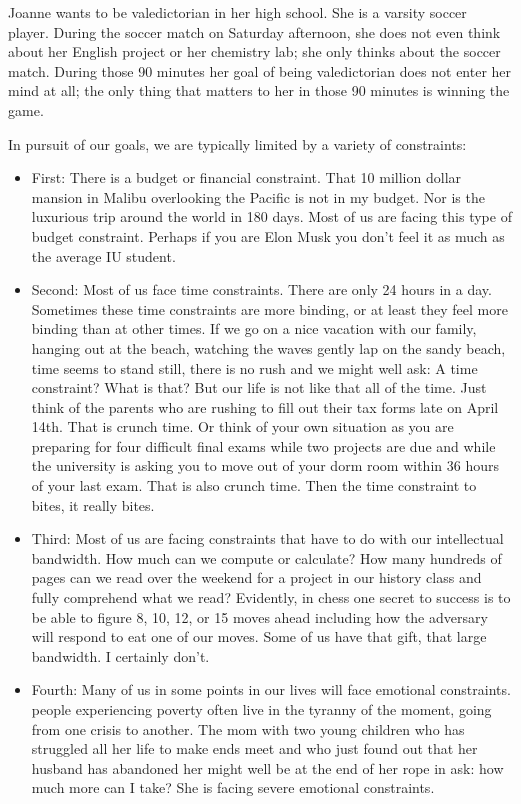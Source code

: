 \documentclass[
]{book}
\begin{document}
Joanne wants to be valedictorian in her high school. She is a varsity soccer player. During the soccer match on Saturday afternoon, she does not even think about her English project or her chemistry lab; she only thinks about the soccer match. During those 90 minutes her goal of being valedictorian does not enter her mind at all; the only thing that matters to her in those 90 minutes is winning the game.

In pursuit of our goals, we are typically limited by a variety of constraints:

\begin{itemize}
\item
  First: There is a budget or financial constraint. That 10 million dollar mansion in Malibu overlooking the Pacific is not in my budget. Nor is the luxurious trip around the world in 180 days. Most of us are facing this type of budget constraint. Perhaps if you are Elon Musk you don't feel it as much as the average IU student.
\item
  Second: Most of us face time constraints. There are only 24 hours in a day. Sometimes these time constraints are more binding, or at least they feel more binding than at other times. If we go on a nice vacation with our family, hanging out at the beach, watching the waves gently lap on the sandy beach, time seems to stand still, there is no rush and we might well ask: A time constraint? What is that? But our life is not like that all of the time. Just think of the parents who are rushing to fill out their tax forms late on April 14th. That is crunch time. Or think of your own situation as you are preparing for four difficult final exams while two projects are due and while the university is asking you to move out of your dorm room within 36 hours of your last exam. That is also crunch time. Then the time constraint to bites, it really bites.
\item
  Third: Most of us are facing constraints that have to do with our intellectual bandwidth. How much can we compute or calculate? How many hundreds of pages can we read over the weekend for a project in our history class and fully comprehend what we read? Evidently, in chess one secret to success is to be able to figure 8, 10, 12, or 15 moves ahead including how the adversary will respond to eat one of our moves. Some of us have that gift, that large bandwidth. I certainly don't.
\item
  Fourth: Many of us in some points in our lives will face emotional constraints. people experiencing poverty often live in the tyranny of the moment, going from one crisis to another. The mom with two young children who has struggled all her life to make ends meet and who just found out that her husband has abandoned her might well be at the end of her rope in ask: how much more can I take? She is facing severe emotional constraints.
\end{itemize}
\end{document}
